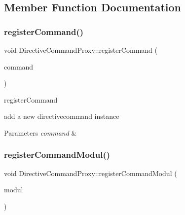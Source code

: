 \subsection{Member Function Documentation}
\mbox{\label{classdirective_1_1DirectiveCommandProxy_a17fe1f9de92de665eec9bff4d5bfd76b}} 
\subsubsection{\texorpdfstring{register\+Command()}{registerCommand()}}
{\footnotesize\ttfamily void Directive\+Command\+Proxy\+::register\+Command (\begin{DoxyParamCaption}\item[{\hyperlink{classdirective_1_1DirectiveCommand}{Directive\+Command} $\ast$}]{command }\end{DoxyParamCaption})}



register\+Command 

add a new directivecommand instance 
\begin{DoxyParams}{Parameters}
{\em command} & \\
\hline
\end{DoxyParams}
\mbox{\label{classdirective_1_1DirectiveCommandProxy_ac69b1d5c1b4d8081c17028c452a5f2da}} 
\subsubsection{\texorpdfstring{register\+Command\+Modul()}{registerCommandModul()}}
{\footnotesize\ttfamily void Directive\+Command\+Proxy\+::register\+Command\+Modul (\begin{DoxyParamCaption}\item[{\hyperlink{classdirective_1_1DirectiveModulInterface}{Directive\+Modul\+Interface} $\ast$}]{modul }\end{DoxyParamCaption})}



